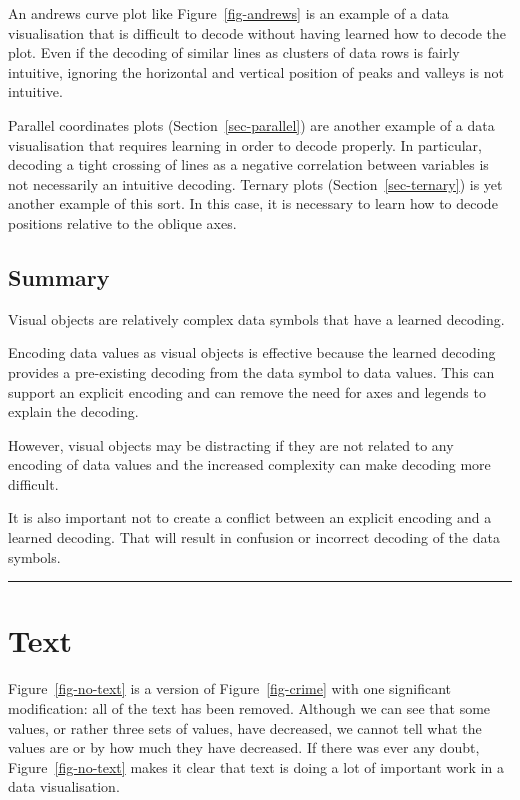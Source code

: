 \documentclass[
  letterpaper,
  DIV=11,
  numbers=noendperiod]{scrreprt}
\begin{document}
An andrews curve plot like Figure~\ref{fig-andrews} is an example of a
data visualisation that is difficult to decode without having learned
how to decode the plot. Even if the decoding of similar lines as
clusters of data rows is fairly intuitive, ignoring the horizontal and
vertical position of peaks and valleys is not intuitive.

Parallel coordinates plots (Section~\ref{sec-parallel}) are another
example of a data visualisation that requires learning in order to
decode properly. In particular, decoding a tight crossing of lines as a
negative correlation between variables is not necessarily an intuitive
decoding. Ternary plots (Section~\ref{sec-ternary}) is yet another
example of this sort. In this case, it is necessary to learn how to
decode positions relative to the oblique axes.

\section{Summary}\label{summary-11}

Visual objects are relatively complex data symbols that have a learned
decoding.

Encoding data values as visual objects is effective because the learned
decoding provides a pre-existing decoding from the data symbol to data
values. This can support an explicit encoding and can remove the need
for axes and legends to explain the decoding.

However, visual objects may be distracting if they are not related to
any encoding of data values and the increased complexity can make
decoding more difficult.

It is also important not to create a conflict between an explicit
encoding and a learned decoding. That will result in confusion or
incorrect decoding of the data symbols.

\begin{center}\rule{0.5\linewidth}{0.5pt}\end{center}

\theendnotes


\chapter{Text}\label{sec-text}

Figure~\ref{fig-no-text} is a version of Figure~\ref{fig-crime} with one
significant modification: all of the text has been removed. Although we
can see that some values, or rather three sets of values, have
decreased, we cannot tell what the values are or by how much they have
decreased. If there was ever any doubt, Figure~\ref{fig-no-text} makes
it clear that text is doing a lot of important work in a data
visualisation.
\end{document}
